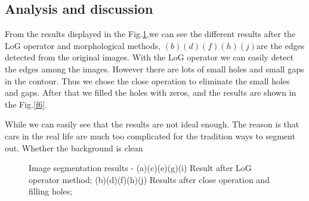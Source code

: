 \documentclass[journal]{IEEEtran}
\begin{document}
\subsection{Analysis and discussion}
From the results displayed in the Fig.\ref{f5},we can see the different results after the LoG operator and morphological methods, $(b)(d)(f)(h)(j)$are the edges detected from the original images. With the  LoG operator we can easily detect the edges among the images. However there are lots of small holes and small gaps in the contour. Thus we chose the close operation to eliminate the small holes and gaps. After that we filled the holes with zeros, and the results are shown in the Fig.\ref{f6}. 

While we can easily see that the results are not ideal enough. The reason is that cars in the real life are much too complicated for the tradition ways to segment out. Whether the background is clean  

\begin{figure}[a]
  \centering
    
  \centering
    
  \centering
    
  \centering
    
  \centering
  \caption{Image segmentation results - (a)(c)(e)(g)(i) Result after LoG operator method; (b)(d)(f)(h)(j) Results after close operation and filling holes; }
  \label{f5} %
\end{figure}
\end{document}
